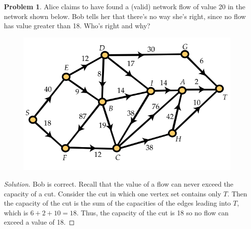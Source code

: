 \documentclass[12pt]{article}
\newcounter{chapternumber}
\theoremstyle{definition}
\newtheorem{problem-internal}{Problem}[chapternumber]
\newenvironment{problem}{
  \medskip
  \begin{problem-internal}
}{
\end{problem-internal}
}
\newenvironment{solution}{
  \begin{proof}[Solution]
    \vspace{-8px}
    \setlength{\parskip}{4px}
    \setlength{\parindent}{0px}
}{
\end{proof}
}
\begin{document}
  \setcounter{chapternumber}{13}
  \setcounter{problem-internal}{1}
  \begin{problem}
    Alice claims to have found a (valid) network flow of value 20 in the network shown below. Bob tells her that there's no way she's right, since no flow has value greater than 18. Who's right and why?

    \begin{figure}[H]
      \centering
      \includegraphics[scale=0.5]{media/network.png}
    \end{figure}

  \end{problem}

  \begin{solution}
    Bob is correct. Recall that the value of a flow can never exceed the capacity of a cut. Consider the cut in which one vertex set contains only \(T\). Then the capacity of the cut is the sum of the capacities of the edges leading into \(T\), which is \(6 + 2 + 10 = 18\). Thus, the capacity of the cut is 18 so no flow can exceed a value of 18.
  \end{solution}
\end{document}
